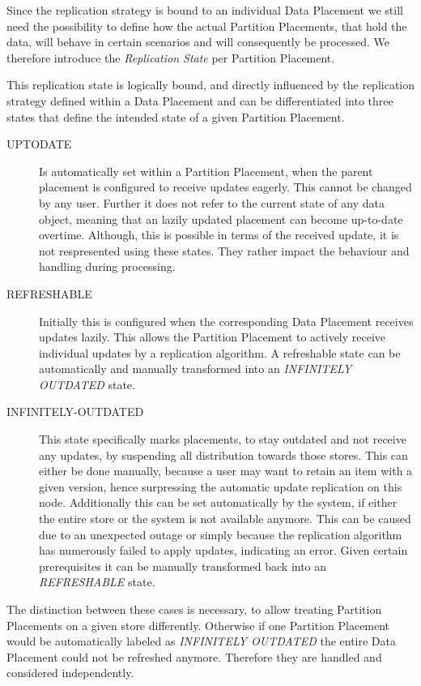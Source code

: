 Since the replication strategy is bound to an individual Data Placement we still need the possibility to 
define how the actual Partition Placements, that hold the data, will behave in certain scenarios and will consequently be processed.
We therefore introduce the \emph{Replication State} per Partition Placement.

This replication state is logically bound, and directly influenced by the replication strategy defined within a Data Placement
and can be differentiated into three states that define the intended state of a given Partition Placement. 
\begin{description}
    \item [UPTODATE] Is automatically set within a Partition Placement, when the parent placement is configured to receive updates eagerly.
    This cannot be changed by any user. Further it does not refer to the current state of any data object, meaning that an lazily updated placement can become up-to-date overtime.
    Although, this is possible in terms of the received update, it is not respresented using these states. They rather impact the behaviour and handling during processing.
    
    \item [REFRESHABLE] Initially this is configured when the corresponding Data Placement receives updates lazily. This allows the Partition Placement to actively receive 
    individual updates by a replication algorithm. A refreshable state can be automatically and manually transformed into an \emph{INFINITELY OUTDATED} state.

    \item [INFINITELY-OUTDATED] This state specifically marks placements, to stay outdated and not receive any updates, by suspending all distribution towards those stores.
    This can either be done manually, because a user may want to
    retain an item with a given version, hence surpressing the automatic update replication on this node. Additionally this can be set automatically by the system, 
    if either the entire store or the system is not available anymore. This can be caused due to an unexpected outage or simply because the replication algorithm has 
    numerously failed to apply updates, indicating an error. Given certain prerequisites it can be manually transformed back into an \emph{REFRESHABLE} state.

\end{description}

The distinction between these cases is necessary, to allow treating Partition Placements on a given store differently. 
Otherwise if one Partition Placement would be automatically labeled as \emph{INFINITELY OUTDATED} the entire Data Placement could not be refreshed anymore.
Therefore they are handled and considered independently.

